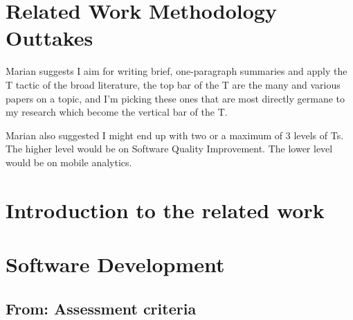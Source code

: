 \section{Related Work Methodology Outtakes}
Marian suggests I aim for writing brief, one-paragraph summaries and apply the T tactic of the broad literature, the top bar of the T are the many and various papers on a topic, and I'm picking these ones that are most directly germane to my research which become the vertical bar of the T. 

Marian also suggested I might end up with two or a maximum of 3 levels of Ts. The higher level would be on Software Quality Improvement. The lower level would be on mobile analytics.

\section{Introduction to the related work}

\section{Software Development}

\subsection{From: Assessment criteria}

